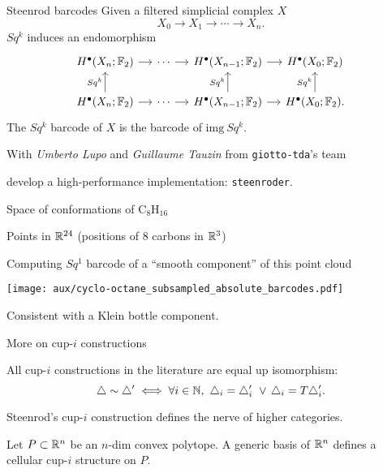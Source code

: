 \begin{frame}[fragile]{Steenrod barcodes} \pause
	Given a filtered simplicial complex $X$
	\[
	X_0 \to X_1 \to \cdots \to X_n.
	\]
	\pause
	$Sq^k$ induces an endomorphism
	\[
	\begin{tikzcd}[column sep = small]
	H^\bullet(X_n; \Ftwo) \arrow[r] & \cdots \arrow[r] & H^\bullet(X_{n-1}; \Ftwo) \arrow[r] & H^\bullet(X_0; \Ftwo) \\
	H^\bullet(X_n; \Ftwo) \arrow[u, "Sq^k"] \arrow[r] & \cdots \arrow[r] & H^\bullet(X_{n-1}; \Ftwo) \arrow[u, "Sq^k"] \arrow[r] & H^\bullet(X_0; \Ftwo) \arrow[u, "Sq^k"].
	\end{tikzcd}
	\]
	The \textcolor{pblue}{$Sq^k$ barcode} of $X$ is the barcode of $\mathrm{img}\ Sq^k$.

	\bigskip\pause

	With \textit{Umberto Lupo} and \textit{Guillaume Tauzin} from \textcolor{pblue}{\texttt{giotto-tda}}'s team

	\medskip
	develop a high-performance implementation: \textcolor{pblue}{\texttt{steenroder}}.
\end{frame}

\begin{frame}{Space of conformations of $\mathrm{C_8H_{16}}$}

	Points in $\mathbb{R}^{24}$ (positions of $8$ carbons in $\mathbb{R}^3$)

	\pause\smallskip

	Computing $Sq^1$ barcode of a ``smooth component'' of this point cloud

	\smallskip

	\texttt{[image: aux/cyclo-octane\_subsampled\_absolute\_barcodes.pdf]}

	Consistent with a \textcolor{pblue}{Klein bottle} component.
\end{frame}

\begin{frame}{More on cup-$i$ constructions}

	\pause

	\begin{theorem}[Med.]
		All cup-$i$ constructions in the literature are equal up isomorphism:
		\[
		\triangle \sim \triangle^\prime \iff \forall i \in \mathbb{N}, \ \triangle_i = \triangle_i^\prime \ \vee \, \triangle_i = T \triangle_i^\prime.
		\]
	\end{theorem}

	\pause

	\begin{theorem}[Med.]
		Steenrod's cup-$i$ construction defines the nerve of higher categories.
	\end{theorem}

	\pause\smallskip

	\begin{theorem}
		Let $P \subset \mathbb{R}^n$ be an $n$-dim convex polytope.
		A generic basis of $\mathbb{R}^n$ defines a cellular cup-$i$ structure on $P$.
	\end{theorem}
\end{frame}

